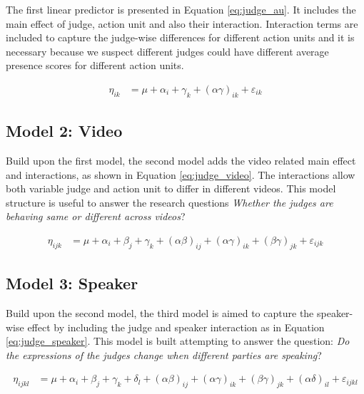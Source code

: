 \documentclass{monashthesis}
\begin{document}
The first linear predictor is presented in Equation \ref{eq:judge_au}. It includes the main effect of judge, action unit and also their interaction. Interaction terms are included to capture the judge-wise differences for different action units and it is necessary because we suspect different judges could have different average presence scores for different action units.

\begin{align}\label{eq:judge_au}
\eta_{ik} &= \mu + \alpha_i + \gamma_k + (\alpha\gamma)_{ik} + \varepsilon_{ik}
\end{align}

\hypertarget{model-2-video}{%
\subsection{Model 2: Video}\label{model-2-video}}

Build upon the first model, the second model adds the video related main effect and interactions, as shown in Equation \ref{eq:judge_video}. The interactions allow both variable judge and action unit to differ in different videos. This model structure is useful to answer the research questions \emph{Whether the judges are behaving same or different across videos}?

\begin{align}\label{eq:judge_video}
\eta_{ijk} &= \mu + \alpha_i + \beta_j +\gamma_k + (\alpha\beta)_{ij} + (\alpha\gamma)_{ik} + (\beta\gamma)_{jk} + \varepsilon_{ijk}
\end{align}

\noindent 

\hypertarget{model-3-speaker}{%
\subsection{Model 3: Speaker}\label{model-3-speaker}}

Build upon the second model, the third model is aimed to capture the speaker-wise effect by including the judge and speaker interaction as in Equation \ref{eq:judge_speaker}. This model is built attempting to answer the question: \emph{Do the expressions of the judges change when different parties are speaking}?

\begin{align}\label{eq:judge_speaker}
\eta_{ijkl} &= \mu + \alpha_i + \beta_j +\gamma_k + \delta_l + (\alpha\beta)_{ij} + (\alpha\gamma)_{ik} + (\beta\gamma)_{jk} + (\alpha\delta)_{il} + \varepsilon_{ijkl}
\end{align}
\end{document}
